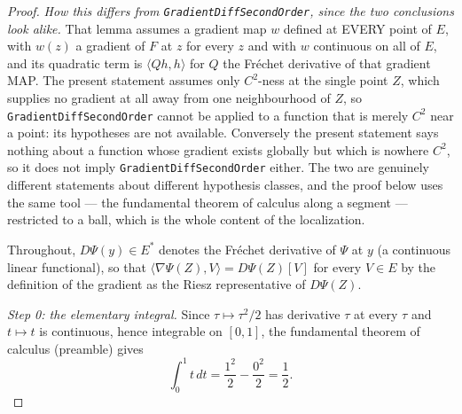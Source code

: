 \begin{proof}
\emph{How this differs from \texttt{GradientDiffSecondOrder}, since the two
conclusions look alike.} That lemma assumes a gradient map $w$ defined at EVERY
point of $E$, with $w(z)$ a gradient of $F$ at $z$ for every $z$ and with $w$
continuous on all of $E$, and its quadratic term is $\langle Qh,h\rangle$ for
$Q$ the Fr\'echet derivative of that gradient MAP. The present statement assumes
only $C^2$-ness at the single point $Z$, which supplies no gradient at all away
from one neighbourhood of $Z$, so \texttt{GradientDiffSecondOrder} cannot be
applied to a function that is merely $C^2$ near a point: its hypotheses are not
available. Conversely the present statement says nothing about a function whose
gradient exists globally but which is nowhere $C^2$, so it does not imply
\texttt{GradientDiffSecondOrder} either. The two are genuinely different
statements about different hypothesis classes, and the proof below uses the same
tool --- the fundamental theorem of calculus along a segment --- restricted to a
ball, which is the whole content of the localization.

Throughout, $D\Psi(y)\in E^\ast$ denotes the Fr\'echet derivative of $\Psi$ at
$y$ (a continuous linear functional), so that
$\langle\nabla\Psi(Z),V\rangle=D\Psi(Z)[V]$ for every $V\in E$ by the definition
of the gradient as the Riesz representative of $D\Psi(Z)$.

\emph{Step 0: the elementary integral.}
Since $\tau\mapsto\tau^2/2$ has derivative $\tau$ at every $\tau$ and
$t\mapsto t$ is continuous, hence integrable on $[0,1]$, the fundamental theorem
of calculus (preamble) gives
\begin{equation}\label{eq:cdp-half}
  \int_0^1t\,dt=\frac{1^2}{2}-\frac{0^2}{2}=\frac12 .
\end{equation}


\end{proof}
